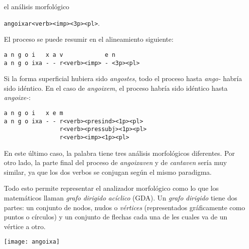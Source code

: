 \begin{persabermes}{el análisis morfológico}
\begin{itemize}
    \texttt{angoixar<verb><imp><3p><pl>}. \end{itemize} El proceso se
  puede resumir en el alineamiento siguiente: 
\begin{verbatim}
a n g o i   x a v            e n
a n g o ixa - - r<verb><imp> - <3p><pl>
\end{verbatim}
Si la forma superficial hubiera sido \emph{angostes}, todo el proceso
hasta \emph{ango-} habría sido idéntico. En el caso de {\em angoixem},
el proceso habría sido idéntico hasta {\em angoixe-}: 
\begin{verbatim}
a n g o i   x e m
a n g o ixa - - r<verb><presind><1p><pl>
                r<verb><pressubj><1p><pl>
                r<verb><imp><1p><pl> 
\end{verbatim}
En este último caso, la palabra tiene tres análisis morfológicos diferentes. Por otro lado, la parte final del proceso de \emph{angoixaven} y de \emph{cantaven} sería muy similar, ya que los dos verbos se conjugan según el mismo paradigma. 

Todo esto permite representar el analizador morfológico como lo que los matemáticos llaman \emph{grafo dirigido acíclico} (GDA). Un \emph{grafo dirigido} tiene dos partes: un conjunto de nodos, nudos o \emph{vértices} (representados gráficamente como  puntos o círculos) y un conjunto de flechas cada una de les cuales va de un vértice a otro. 

\texttt{[image: angoixa]} 


\end{persabermes}
